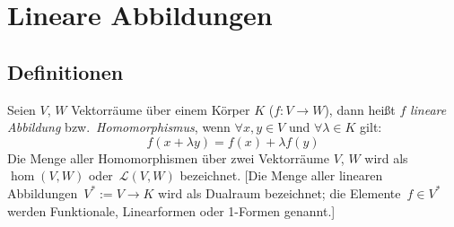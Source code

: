 

\chapter{\label{chap:lineare-abbildungen}Lineare Abbildungen}



\section{Definitionen}

Seien $V$, $W$ Vektorräume über einem Körper $K$ ($f:V\to W$), dann heißt $f$ \emph{lineare Abbildung} bzw.~\emph{Homomorphismus},
wenn $\forall x,y\in V$ und $\forall\lambda\in K$ gilt:
\[ f(x+\lambda y)=f(x)+\lambda f(y) \]
Die Menge aller Homomorphismen über zwei Vektorräume $V$, $W$ wird als~$\hom(V,W)$ oder~$\mathcal L(V, W)$ bezeichnet.
[Die Menge aller linearen Abbildungen~$V^* := V \to K$ wird als Dualraum bezeichnet; die Elemente~$f \in V^*$ werden Funktionale, Linearformen oder 1-Formen genannt.]
